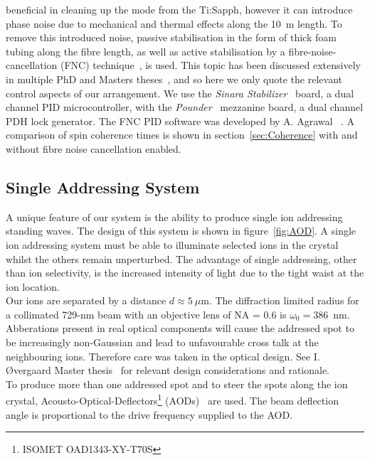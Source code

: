    beneficial in cleaning up the mode from the Ti:Sapph, however it can
    introduce phase noise due to mechanical and thermal effects along the 10~m
    length. To remove this introduced noise, passive stabilisation in
    the form of thick foam tubing along the fibre length, as well as active
    stabilisation by a fibre-noise-cancellation (FNC) technique~\cite{}, is used. This
    topic has been discussed extensively in multiple PhD and Masters
    theses~\cite{}, and so here we only quote the relevant control aspects of
    our arrangement. We use the \emph{Sinara Stabilizer}~\cite{} board, a
    dual channel PID microcontroller, with the \emph{Pounder}~\cite{}
    mezzanine board, a dual channel PDH lock generator. The FNC PID software was
    developed by A. Agrawal ~\cite{}. A comparison of spin coherence times
    is shown in section~\ref{sec:Coherence} with and without fibre noise
    cancellation enabled. \\


\subsection{Single Addressing System}
\label{sec:Single Addressing System}
    A unique feature of our system is the ability to produce single ion addressing standing waves.
    The design of this system is shown in
    figure~\ref{fig:AOD}.  A single ion addressing system must be able to
    illuminate selected ions in the crystal whilst the others remain
    unperturbed. The advantage of single addressing, other than ion selectivity,
    is the increased intensity of light due to the tight waist at the ion
    location. \\
    Our ions are separated by a distance $d\approx 5~\mu$m.  The diffraction limited radius for a
    collimated 729-nm beam with an objective lens of NA = 0.6 is $\omega_0 = 386$~nm.  Abberations present in real optical
    components will cause the addressed spot to be increasingly non-Gaussian and
    lead to unfavourable cross talk at the neighbouring ions. Therefore care was
    taken in the optical design. See I. {\O}vergaard Master thesis~\cite{} for relevant design considerations and rationale.\\
    To produce more than one addressed spot and to steer the spots along the ion
    crystal, Acousto-Optical-Deflectors\footnote{ISOMET OAD1343-XY-T70S}
    (AODs)~\cite{nagourney_quantum_2014, li_low-crosstalk_2023,
    pogorelov_compact_2021} are used. The beam deflection angle is proportional to the
    drive frequency supplied to the AOD.  \\